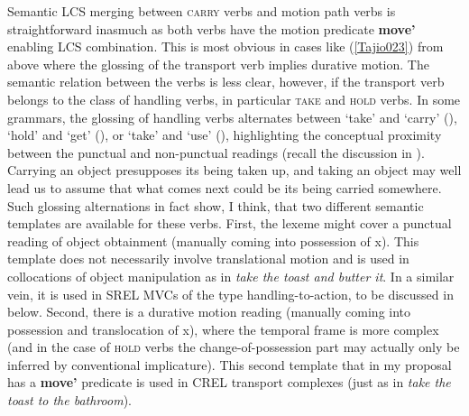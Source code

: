 Semantic LCS merging between \textsc{carry} verbs and motion path verbs is straightforward inasmuch as both verbs have the motion predicate \textbf{move'} enabling LCS combination. This is most obvious in cases like (\ref{Tajio023}) from  above where the glossing of the transport verb implies durative motion. The semantic relation between the verbs is less clear, however, if the transport verb belongs to the class of handling verbs, in particular \textsc{take} and \textsc{hold} verbs. In some grammars, the glossing of handling verbs alternates between `take' and `carry' (), `hold' and `get' (), or `take' and `use' (), highlighting the conceptual proximity between the punctual and non-punctual readings (recall the discussion in ). Carrying an object presupposes its being taken up, and taking an object may well lead us to assume that what comes next could be its being carried somewhere. Such glossing alternations in fact show, I think, that two different semantic templates are available for these verbs. First, the lexeme might cover a punctual reading of object obtainment (manually coming into possession of x). This template does not necessarily involve translational motion and is used in collocations of object manipulation as in  \textit{take the toast and butter it}. In a similar vein, it is used in SREL MVCs of the type handling-to-action, to be discussed in  below. Second, there is a durative motion reading (manually coming into possession and translocation of x), where the temporal frame is more complex (and in the case of \textsc{hold} verbs the change-of-possession part may actually only be inferred by conventional implicature). This second template that in my proposal has a \textbf{move'} predicate is used in CREL transport complexes (just as in \textit{take the toast to the bathroom}). 


